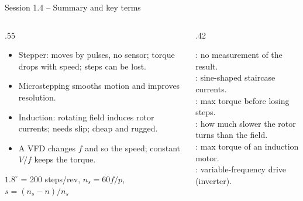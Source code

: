 \documentclass[aspectratio=169,10pt]{beamer}
\begin{document}
\begin{frame}{Session 1.4 -- Summary and key terms}
\begin{columns}[T]
\begin{column}{.55\textwidth}
\small
\begin{itemize}
\item Stepper: moves by pulses, no sensor; torque drops with speed; steps can be lost.
\item Microstepping smooths motion and improves resolution.
\item Induction: rotating field induces rotor currents; needs slip; cheap and rugged.
\item A VFD changes $f$ and so the speed; constant $V/f$ keeps the torque.
\end{itemize}
\begin{keybox}[Remember]
$1.8^\circ$ = 200 steps/rev, \quad $n_s=60f/p$, \quad $s=(n_s-n)/n_s$
\end{keybox}
\end{column}
\begin{column}{.42\textwidth}
\begin{defbox}
\small
{}: no measurement of the result.\\
: sine-shaped staircase currents.\\
: max torque before losing steps.\\
: how much slower the rotor turns than the field.\\
: max torque of an induction motor.\\
: variable-frequency drive (inverter).
\end{defbox}
\end{column}
\end{columns}
\end{frame}

\end{document}
